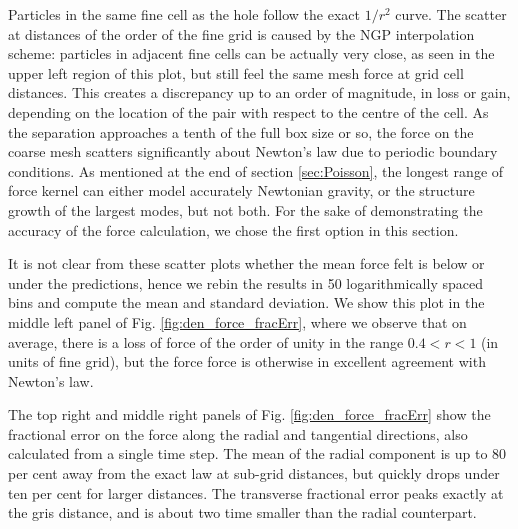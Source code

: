 \documentclass[useAMS,usenatbib]{mn2e}
\begin{document}
Particles in the same fine cell as the hole follow the exact $1/r^{2}$ curve. The scatter at 
  distances of the order of the fine grid is caused by the NGP interpolation scheme:
  particles in adjacent fine cells can be actually very close, as seen in the upper left region of this plot,
  but still feel the same mesh force at grid cell distances.
This  creates a discrepancy up to an order of magnitude, in loss or gain, depending on the location of the pair with respect to the centre of the cell.
As the separation approaches a tenth of the full box size or so, the force on the coarse mesh 
scatters significantly about Newton's law due to periodic boundary conditions. 
As mentioned at the end of section \ref{sec:Poisson}, the longest range of force kernel can either model accurately Newtonian gravity,
or the structure growth of the largest modes, but not both. For the sake of demonstrating the accuracy of the force calculation,
we chose the first option in this section.

It is not clear from these scatter plots whether the mean force felt  is below or under the predictions, hence we rebin the results
in 50 logarithmically spaced bins and compute the mean and standard deviation. 
We show this plot in the middle left panel of Fig. \ref{fig:den_force_fracErr}, where we observe that on average,
there is a loss of force of the order of unity in the range $ 0.4 < r < 1$ (in units of fine grid), but the force force is otherwise
in excellent agreement with Newton's law.


The top right and middle right panels of Fig. \ref{fig:den_force_fracErr} show the fractional error on the force along the radial and tangential directions, also calculated from a single time step.
The mean of the radial component is up to 80 per cent away from the exact law at sub-grid distances, but quickly drops under ten per cent for larger distances. 
The transverse fractional error peaks exactly at the gris distance,  and is about two time smaller than the radial counterpart.
\end{document}
